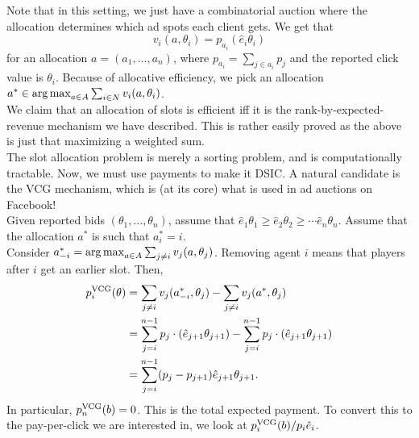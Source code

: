 \begin{fex}
			Note that in this setting, we just have a combinatorial auction where the allocation determines which ad spots each client gets.
			We get that
			\[ v_i(a,\theta_i) = p_{a_i} (\hat{e}_i \theta_i) \]
			for an allocation $a = (a_1,\ldots,a_n)$, where $p_{a_i} = \sum_{j \in a_i} p_j$ and the reported click value is $\theta_i$. Because of allocative efficiency, we pick an allocation $a^* \in \operatorname*{arg\,max}_{a \in A} \sum_{i \in N} v_i(a,\theta_i)$.\\
			We claim that an allocation of slots is efficient iff it is the rank-by-expected-revenue mechanism we have described. This is rather easily proved as the above is just that maximizing a weighted sum.\\
			The slot allocation problem is merely a sorting problem, and is computationally tractable. Now, we must use payments to make it DSIC. A natural candidate is the VCG mechanism, which is (at its core) what is used in ad auctions on Facebook!\\
			Given reported bids $(\theta_1,\ldots,\theta_n)$, assume that $\hat{e}_1 \theta_1 \ge \hat{e}_2 \theta_2 \ge \cdots \hat{e}_n \theta_n$. Assume that the allocation $a^*$ is such that $a_i^* = i$.\\
			Consider $a_{-i}^* = \operatorname*{arg\,max}_{a \in A} \sum_{j \ne i} v_j(a,\theta_j)$. Removing agent $i$ means that players after $i$ get an earlier slot. Then,
			\begin{align*}
				p_i^{\text{VCG}}(\theta) &= \sum_{j \ne i} v_j(a_{-i}^*,\theta_j) - \sum_{j \ne i} v_j(a^*,\theta_j) \\
					&= \sum_{j=i}^{n-1} p_j\cdot (\hat{e}_{j+1} \theta_{j+1}) - \sum_{j = i}^{n-1} p_j\cdot (\hat{e}_{j+1} \theta_{j+1}) \\
					&= \sum_{j=i}^{n-1} (p_j - p_{j+1}) \hat{e}_{j+1} \theta_{j+1}.
			\end{align*}
			In particular, $p_n^{\text{VCG}}(b) = 0$. This is the total expected payment. To convert this to the pay-per-click we are interested in, we look at $p_i^{\text{VCG}}(b)/p_i\hat{e}_i$.
		\end{fex}

